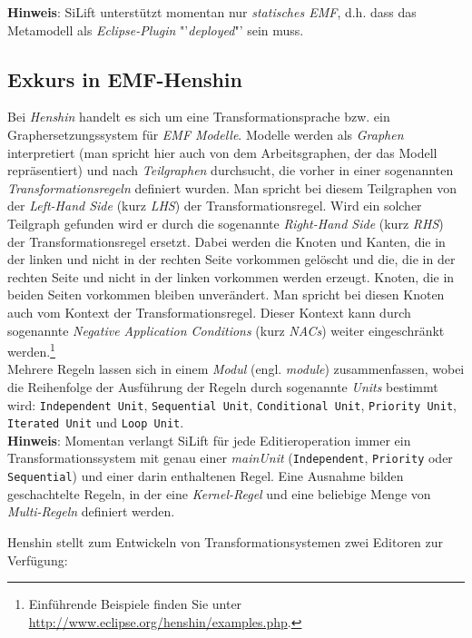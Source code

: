 \documentclass[a4paper]{scrartcl}
\begin{document}
\textbf{Hinweis}: SiLift unterstützt momentan nur \textit{statisches EMF}, d.h. dass das Metamodell als \textit{Eclipse-Plugin} "'\textit{deployed}"' sein muss.


\subsection{Exkurs in EMF-Henshin}

Bei \textit{Henshin} handelt es sich um eine Transformationsprache bzw. ein Graphersetzungssystem für \textit{EMF Modelle}. 
Modelle werden als \textit{Graphen} interpretiert (man spricht hier auch von dem Arbeitsgraphen, der das Modell repräsentiert) und nach \textit{Teilgraphen} durchsucht, die vorher in einer sogenannten \textit{Transformationsregeln} definiert wurden.
Man spricht bei diesem Teilgraphen von der \textit{Left-Hand Side} (kurz \textit{LHS}) der Trans\-for\-ma\-tions\-re\-gel. 
Wird ein solcher Teilgraph gefunden wird er durch die sogenannte \textit{Right-Hand Side} (kurz \textit{RHS}) der Transformationsregel ersetzt. 
Dabei werden die Knoten und Kanten, die in der linken und nicht in der rechten Seite vorkommen gelöscht und die, die in der rechten Seite und nicht in der linken vorkommen werden erzeugt.
Knoten, die in beiden Seiten vorkommen bleiben unverändert.
Man spricht bei diesen Knoten auch vom Kontext der Transformationsregel.
Dieser Kontext kann durch sogenannte \textit{Negative Application Conditions} (kurz \textit{NACs}) weiter eingeschränkt werden.\footnote{Einführende Beispiele finden Sie unter \url{http://www.eclipse.org/henshin/examples.php}.}\\
Mehrere Regeln lassen sich in einem \textit{Modul} (engl. \textit{module}) zusammenfassen, wobei die Reihenfolge der Ausführung der Regeln durch sogenannte \textit{Units} bestimmt wird: \texttt{Independent Unit}, \texttt{Sequential Unit}, \texttt{Conditional Unit}, \texttt{Priority Unit}, \texttt{Iterated Unit} und \texttt{Loop Unit}.\\

\textbf{Hinweis}: Momentan verlangt SiLift für jede Editieroperation immer ein Transformationssystem mit genau einer \textit{mainUnit} (\texttt{Independent}, \texttt{Priority} oder \texttt{Sequential}) und einer darin enthaltenen Regel. Eine Ausnahme bilden geschachtelte Regeln, in der eine \textit{Kernel-Regel} und eine beliebige Menge von \textit{Multi-Regeln} definiert werden.


Henshin stellt zum Entwickeln von Transformationsystemen zwei Editoren zur Verfügung:
\end{document}
